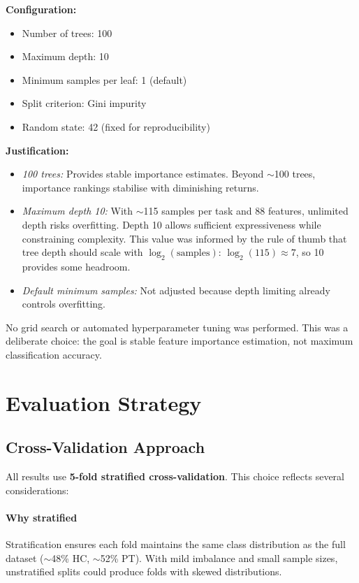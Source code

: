 \textbf{Configuration:}
\begin{itemize}
    \item Number of trees: 100
    \item Maximum depth: 10
    \item Minimum samples per leaf: 1 (default)
    \item Split criterion: Gini impurity
    \item Random state: 42 (fixed for reproducibility)
\end{itemize}

\textbf{Justification:}
\begin{itemize}
    \item \textit{100 trees:} Provides stable importance estimates. Beyond $\sim$100 trees, importance rankings stabilise with diminishing returns.
    \item \textit{Maximum depth 10:} With $\sim$115 samples per task and 88 features, unlimited depth risks overfitting. Depth 10 allows sufficient expressiveness while constraining complexity. This value was informed by the rule of thumb that tree depth should scale with $\log_2(\text{samples})$: $\log_2(115) \approx 7$, so 10 provides some headroom.
    \item \textit{Default minimum samples:} Not adjusted because depth limiting already controls overfitting.
\end{itemize}

No grid search or automated hyperparameter tuning was performed. This was a deliberate choice: the goal is stable feature importance estimation, not maximum classification accuracy.

\section{Evaluation Strategy}

\subsection{Cross-Validation Approach}

All results use \textbf{5-fold stratified cross-validation}. This choice reflects several considerations:

\paragraph{Why stratified} Stratification ensures each fold maintains the same class distribution as the full dataset ($\sim$48\% HC, $\sim$52\% PT). With mild imbalance and small sample sizes, unstratified splits could produce folds with skewed distributions.

